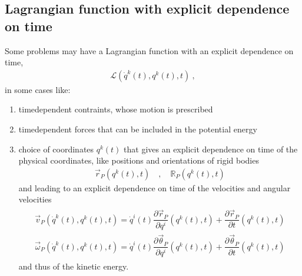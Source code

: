 \documentclass[letterpaper,10pt,english]{jupyterBook}
\begin{document}
\subsection{Lagrangian function with explicit dependence on time}
\label{\detokenize{ch/lagrange-t-explicit:lagrangian-function-with-explicit-dependence-on-time}}\label{\detokenize{ch/lagrange-t-explicit:classical-mechanics-lagrange-time-dependent}}\label{\detokenize{ch/lagrange-t-explicit::doc}}
\sphinxAtStartPar
Some problems may have a Lagrangian function with an explicit dependence on time,
\begin{equation*}
\begin{split}\mathscr{L}\left(\dot{q}^k(t),q^k(t),t\right) \ ,\end{split}
\end{equation*}
\sphinxAtStartPar
in some cases like:
\begin{enumerate}
%
\item {} 
\sphinxAtStartPar
time\sphinxhyphen{}dependent contraints, whose motion is prescribed

\item {} 
\sphinxAtStartPar
time\sphinxhyphen{}dependent forces that can be included in the potential energy

\item {} 
\sphinxAtStartPar
choice of coordinates \(q^k(t)\) that gives an explicit dependence on time of the physical coordinates, like positions and orientations of rigid bodies
\begin{equation*}
\begin{split}\vec{r}_P\left(q^k(t),t \right) \quad , \quad \mathbb{R}_P\left( q^{k}(t), t \right)\end{split}
\end{equation*}
\sphinxAtStartPar
and leading to an explicit dependence on time of the velocities and angular velocities
\begin{equation*}
\begin{split}\begin{aligned}
      \vec{v}_P\left(\dot{q}^k(t), q^k(t),t \right)  = \dot{q}^i(t) \dfrac{\partial \vec{r}_P}{\partial q^i} \left(q^k(t),t \right) + \dfrac{\partial \vec{r}_P}{\partial t} \left(q^k(t),t \right)  \\
      \vec{\omega}_P\left(\dot{q}^k(t), q^{k}(t), t \right) = \dot{q}^i(t) \dfrac{\partial \vec{\theta}_P}{\partial q^i} \left(q^k(t),t \right) + \dfrac{\partial \vec{\theta}_P}{\partial t}\left(q^k(t),t \right) 
    \end{aligned}\end{split}
\end{equation*}
\sphinxAtStartPar
and thus of the kinetic energy.

\end{enumerate}
\end{document}
